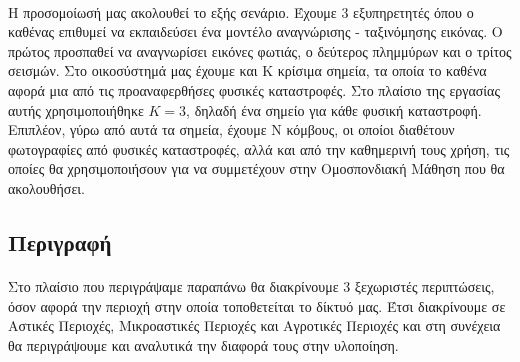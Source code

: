\vspace{-0.5cm}

\paragraph{}Η προσομοίωσή μας ακολουθεί το εξής σενάριο. Έχουμε 3 εξυπηρετητές όπου ο καθένας επιθυμεί να εκπαιδεύσει ένα μοντέλο αναγνώρισης - ταξινόμησης εικόνας. Ο πρώτος προσπαθεί να αναγνωρίσει εικόνες φωτιάς, ο δεύτερος πλημμύρων και ο τρίτος σεισμών. Στο οικοσύστημά μας έχουμε και Κ κρίσιμα σημεία, τα οποία το καθένα αφορά μια από τις προαναφερθήσες φυσικές καταστροφές. Στο πλαίσιο της εργασίας αυτής χρησιμοποιήθηκε $K=3$, δηλαδή ένα σημείο για κάθε φυσική καταστροφή. Επιπλέον, γύρω από αυτά τα σημεία, έχουμε Ν κόμβους, οι οποίοι διαθέτουν φωτογραφίες από φυσικές καταστροφές, αλλά και από την καθημερινή τους χρήση, τις οποίες θα χρησιμοποιήσουν για να συμμετέχουν στην Ομοσπονδιακή Μάθηση που θα ακολουθήσει.

\vspace{-0.5cm}

\subsection{Περιγραφή}

\paragraph{}Στο πλαίσιο που περιγράψαμε παραπάνω θα διακρίνουμε 3 ξεχωριστές περιπτώσεις, όσον αφορά την περιοχή στην οποία τοποθετείται το δίκτυό μας. Έτσι διακρίνουμε σε Αστικές Περιοχές, Μικροαστικές Περιοχές και Αγροτικές Περιοχές και στη συνέχεια θα περιγράψουμε και αναλυτικά την διαφορά τους στην υλοποίηση. 

\vspace{-0.5cm}

